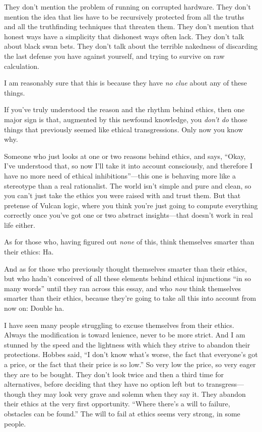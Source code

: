  They don't mention the problem of running on
corrupted hardware. They don't mention the idea that
lies have to be recursively protected from all the truths and all the
truthfinding techniques that threaten them. They don't
mention that honest ways have a simplicity that dishonest ways often
lack. They don't talk about black swan bets. They
don't talk about the terrible nakedness of discarding
the last defense you have against yourself, and trying to survive on
raw calculation.

{
 I am reasonably sure that this is because they have \textit{no
clue} about any of these things.}


 If you've truly understood the reason and the
rhythm behind ethics, then one major sign is that, augmented by this
newfound knowledge, you \textit{don't do} those things
that previously seemed like ethical transgressions. Only now you know
why.


 Someone who just looks at one or two reasons behind ethics, and
says, ``Okay, I've understood that, so
now I'll take it into account consciously, and
therefore I have no more need of ethical
inhibitions''---this one is behaving more like a
stereotype than a real rationalist. The world isn't
simple and pure and clean, so you can't just take the
ethics you were raised with and trust them. But that pretense of Vulcan
logic, where you think you're just going to compute
everything correctly once you've got one or two
abstract insights---that doesn't work in real life
either.


 As for those who, having figured out \textit{none} of this, think
themselves smarter than their ethics: Ha.


 And as for those who previously thought themselves smarter than
their ethics, but who hadn't conceived of all these
elements behind ethical injunctions ``in so many
words'' until they ran across this essay, and who
\textit{now} think themselves smarter than their ethics, because
they're going to take all this into account from now
on: Double ha.


 I have seen many people struggling to excuse themselves from their
ethics. Always the modification is toward lenience, never to be more
strict. And I am stunned by the speed and the lightness with which they
strive to abandon their protections. Hobbes said, ``I
don't know what's worse, the fact that
everyone's got a price, or the fact that their price is
so low.'' So very low the price, so very eager they
are to be bought. They don't look twice and then a
third time for alternatives, before deciding that they have no option
left but to transgress---though they may look very grave and solemn
when they say it. They abandon their ethics at the very first
opportunity. ``Where there's a will to
failure, obstacles can be found.'' The will to fail
at ethics seems very strong, in some people.


